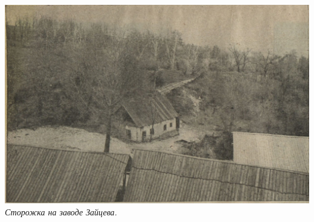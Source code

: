 \vspace*{\fill}
\begin{center}
\includegraphics[width=\linewidth]{chast-kirvys/beylis/1912-beylis-storojka.jpg}
\textit{Сторожка на заводе Зайцева.}
\end{center}
\vspace*{\fill}
\newpage

